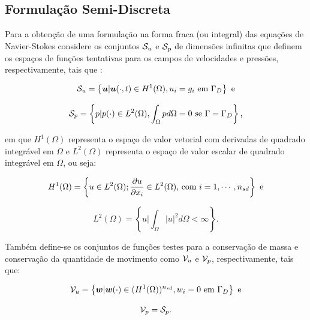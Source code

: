 \subsection{Formulação Semi-Discreta} \label{FSD}

Para a obtenção de uma formulação na forma fraca (ou integral) das equações de Navier-Stokes considere os conjuntos $\mathcal{S}_u$ e $\mathcal{S}_p$ de dimensões infinitas que definem os espaços de funções tentativas para os campos de velocidades e pressões, respectivamente, tais que \cite{bazilevs2013computational,fernandes2020tecnica}:

\begin{equation}
    \mathcal{S}_u=\left\{\boldsymbol{u}|\boldsymbol{u}(\cdot,t)\in H^1(\Omega),u_i=g_i\text{ em }\Gamma_D\right\}\text{ e}
\end{equation}

\begin{equation}
    \mathcal{S}_p=\left\{p|p(\cdot)\in L^2(\Omega),\int_\Omega{pd\Omega}=0\text{ se }\Gamma=\Gamma_D\right\}\text{,}
\end{equation}

\noindent em que $H^1(\Omega)$ representa o espaço de valor vetorial com derivadas de quadrado integrável em $\Omega$ e $L^2(\Omega)$ representa o espaço de valor escalar de quadrado integrável em $\Omega$, ou seja:

\begin{equation}
    H^1(\Omega)=\left\{u\in L^2(\Omega);\frac{\partial{u}}{\partial{x_i}}\in L^2(\Omega)\text{, com }i=1,\cdots,n_{sd}\right\}\text{ e}
\end{equation}

\begin{equation}
    L^2(\Omega)=\left\{u|\int_\Omega{|u|^2d\Omega}<\infty\right\}\text{.}
\end{equation}

Também define-se os conjuntos de funções testes para a conservação de massa e conservação da quantidade de movimento como $\mathcal{V}_u$ e $\mathcal{V}_p$, respectivamente, tais que:

\begin{equation}
    \mathcal{V}_u=\left\{\boldsymbol{w}|\boldsymbol{w}(\cdot)\in(H^1(\Omega))^{n_{sd}},w_i=0\text{ em }\Gamma_D\right\}\text{ e}
\end{equation}

\begin{equation}
    \mathcal{V}_p=\mathcal{S}_p\text{.}
\end{equation}

